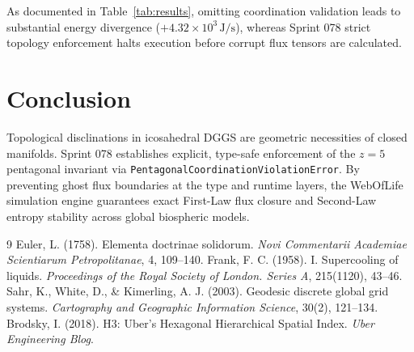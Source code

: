\documentclass[10pt,twocolumn,a4paper]{article}
\begin{document}
As documented in Table~\ref{tab:results}, omitting coordination validation leads to substantial energy divergence ($+4.32 \times 10^3\,\text{J/s}$), whereas Sprint 078 strict topology enforcement halts execution before corrupt flux tensors are calculated.

\section{Conclusion}

Topological disclinations in icosahedral DGGS are geometric necessities of closed manifolds. Sprint 078 establishes explicit, type-safe enforcement of the $z=5$ pentagonal invariant via \texttt{PentagonalCoordinationViolationError}. By preventing ghost flux boundaries at the type and runtime layers, the WebOfLife simulation engine guarantees exact First-Law flux closure and Second-Law entropy stability across global biospheric models.

\begin{thebibliography}{9}
Euler, L. (1758). Elementa doctrinae solidorum. \textit{Novi Commentarii Academiae Scientiarum Petropolitanae}, 4, 109--140.
Frank, F. C. (1958). I. Supercooling of liquids. \textit{Proceedings of the Royal Society of London. Series A}, 215(1120), 43--46.
Sahr, K., White, D., \& Kimerling, A. J. (2003). Geodesic discrete global grid systems. \textit{Cartography and Geographic Information Science}, 30(2), 121--134.
Brodsky, I. (2018). H3: Uber’s Hexagonal Hierarchical Spatial Index. \textit{Uber Engineering Blog}.
\end{thebibliography}
\end{document}
